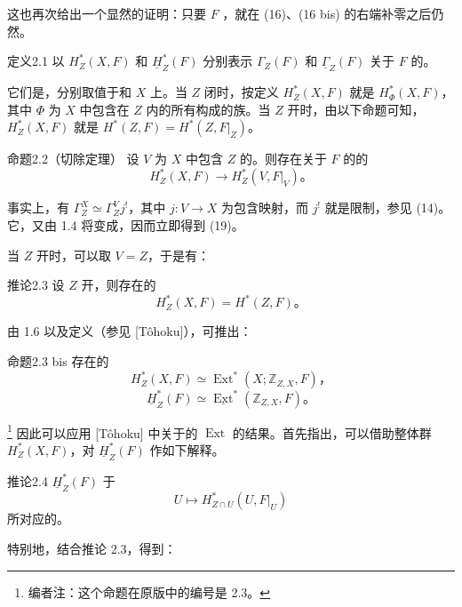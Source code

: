 这也再次给出一个显然的证明：只要 $F$ ，就在 (16)、(16 bis) 的右端补零之后仍然。

\begin{SGAresult}{定义}{2.1}
以 $H_Z^*(X,F)$ 和 $\underline H_Z^*(F)$ 分别表示 $\Gamma_Z(F)$ 和 $\underline{\Gamma}_Z(F)$ 关于 $F$ 的。
\end{SGAresult}
它们是，分别取值于和 $X$ 上。当 $Z$ 闭时，按定义 $H_Z^*(X,F)$ 就是 $H_\Phi^*(X,F)$，其中 $\Phi$ 为 $X$ 中包含在 $Z$ 内的所有构成的族。当 $Z$ 开时，由以下命题可知，$H_Z^*(X,F)$ 就是 $H^*(Z,F)=H^*(Z,F|_Z)$。
\begin{SGAresult}{命题}{2.2（切除定理）}
设 $V$ 为 $X$ 中包含 $Z$ 的。则存在关于 $F$ 的的
\[
H_Z^*(X,F)\longrightarrow H_Z^*(V,F|_V)。\tag{19}
\]
\end{SGAresult}
事实上，有 $\Gamma_Z^X\simeq\Gamma_Z^Vj^!$，其中 $j:V\to X$ 为包含映射，而 $j^!$ 就是限制，参见 (14)。它，又由 1.4 将变成，因而立即得到 (19)。

当 $Z$ 开时，可以取 $V=Z$，于是有：
\begin{SGAresult}{推论}{2.3}
设 $Z$ 开，则存在的
\[
H_Z^*(X,F)=H^*(Z,F)。\tag{20}
\]
\end{SGAresult}
由 1.6 以及定义（参见 [Tôhoku]），可推出：
\begin{SGAresult}{命题}{2.3 bis}
存在的
\[
H_Z^*(X,F)\simeq\operatorname{Ext}^*(X;\mathbb Z_{Z,X},F)，\tag{21}
\]
\[
\underline H_Z^*(F)\simeq\underline{\operatorname{Ext}}^*(\mathbb Z_{Z,X},F)。\tag{21 bis}
\]
\end{SGAresult}
\footnote{编者注：这个命题在原版中的编号是 2.3。}
因此可以应用 [Tôhoku] 中关于的 $\operatorname{Ext}$ 的结果。首先指出，可以借助整体群 $H_Z^*(X,F)$，对 $\underline H_Z^*(F)$ 作如下解释。
\begin{SGAresult}{推论}{2.4}
$\underline H_Z^*(F)$ 于
\[
U\longmapsto H_{Z\cap U}^*(U,F|_U)
\]
所对应的。
\end{SGAresult}
特别地，结合推论 2.3，得到：

